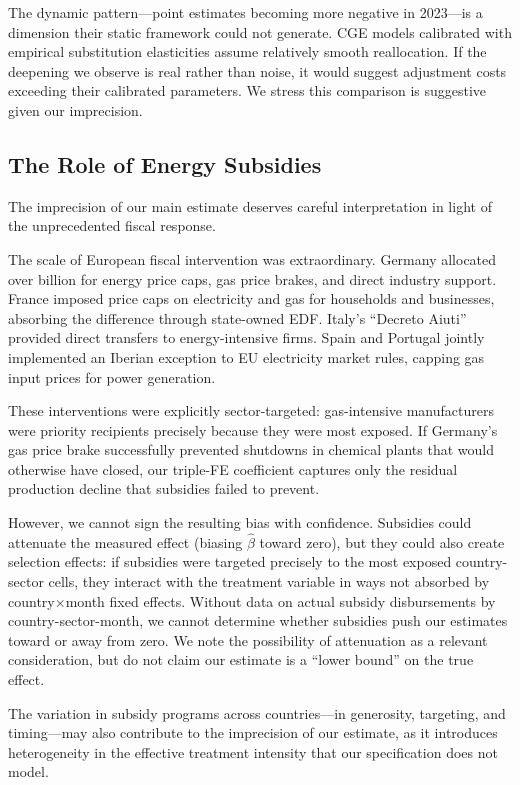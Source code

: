 \documentclass[12pt]{article}
\begin{document}
The dynamic pattern---point estimates becoming more negative in 2023---is a dimension their static framework could not generate. CGE models calibrated with empirical substitution elasticities assume relatively smooth reallocation. If the deepening we observe is real rather than noise, it would suggest adjustment costs exceeding their calibrated parameters. We stress this comparison is suggestive given our imprecision.

\subsection{The Role of Energy Subsidies}

The imprecision of our main estimate deserves careful interpretation in light of the unprecedented fiscal response.

The scale of European fiscal intervention was extraordinary. Germany allocated over  billion for energy price caps, gas price brakes, and direct industry support. France imposed price caps on electricity and gas for households and businesses, absorbing the difference through state-owned EDF. Italy's ``Decreto Aiuti'' provided direct transfers to energy-intensive firms. Spain and Portugal jointly implemented an Iberian exception to EU electricity market rules, capping gas input prices for power generation.

These interventions were explicitly sector-targeted: gas-intensive manufacturers were priority recipients precisely because they were most exposed. If Germany's gas price brake successfully prevented shutdowns in chemical plants that would otherwise have closed, our triple-FE coefficient captures only the residual production decline that subsidies failed to prevent.

However, we cannot sign the resulting bias with confidence. Subsidies could attenuate the measured effect (biasing $\hat{\beta}$ toward zero), but they could also create selection effects: if subsidies were targeted precisely to the most exposed country-sector cells, they interact with the treatment variable in ways not absorbed by country$\times$month fixed effects. Without data on actual subsidy disbursements by country-sector-month, we cannot determine whether subsidies push our estimates toward or away from zero. We note the possibility of attenuation as a relevant consideration, but do not claim our estimate is a ``lower bound'' on the true effect.

The variation in subsidy programs across countries---in generosity, targeting, and timing---may also contribute to the imprecision of our estimate, as it introduces heterogeneity in the effective treatment intensity that our specification does not model.
\end{document}
